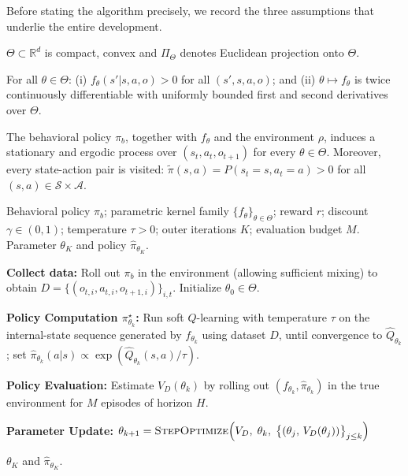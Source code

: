 \documentclass[12pt]{article}
\renewcommand{\[}{\left[}
\renewcommand{\]}{\right]}
\renewcommand{\(}{\left(}
\renewcommand{\)}{\right)}
\newcounter{l1}
\newcounter{l2}
\newcounter{l3}
\renewcommand{\tilde}{\widetilde}
\begin{document}
Before stating the algorithm precisely, we record the three assumptions that underlie
the entire development.

\begin{assumption}\label{ass:compact}
$\Theta \subset \mathbb{R}^d$ is compact, convex and $\Pi_\Theta$ denotes Euclidean projection
onto $\Theta$.
\end{assumption}

\begin{assumption}\label{ass:smooth_kernel}
For all $\theta \in \Theta$: (i) $f_\theta(s'|s,a,o) > 0$ for all $(s',s,a,o)$; and
(ii) $\theta \mapsto f_\theta$ is twice continuously differentiable with uniformly
bounded first and second derivatives over $\Theta$.
\end{assumption}

\begin{assumption}\label{ass:ergodic}
The behavioral policy $\pi_b$, together with $f_\theta$ and the environment $\rho$,
induces a stationary and ergodic process over $(s_t, a_t, o_{t+1})$ for every
$\theta \in \Theta$. Moreover, every state-action pair is visited:
$\tilde{\pi}(s,a) = P(s_t{=}s, a_t{=}a) > 0$ for all $(s,a) \in \mathcal{S}\times\mathcal{A}$.
\end{assumption}

\begin{algorithm}[t]
\caption{Iterative Agent Design}
\label{alg:main}
\begin{algorithmic}[1]
\Require Behavioral policy $\pi_b$; parametric kernel family $\{f_\theta\}_{\theta\in\Theta}$;
  reward $r$; discount $\gamma\!\in\!(0,1)$; temperature $\tau\!>\!0$;
  outer iterations $K$; evaluation budget $M$.
\Ensure Parameter $\theta_K$ and policy $\widehat\pi_{\theta_K}$.

\State \textbf{Collect data:} Roll out $\pi_b$ in the environment (allowing sufficient
  mixing) to obtain $D = \{(o_{t,i}, a_{t,i}, o_{t+1,i})\}_{i,t}$.
\State Initialize $\theta_0 \in \Theta$.

  \State \textbf{Policy Computation $\pi^\star_{\theta_k}$:}
    Run soft $Q$-learning with temperature $\tau$ on the internal-state sequence
    generated by $f_{\theta_k}$ using dataset $D$, until convergence to
    $\widehat{Q}_{\theta_k}$; set
    $\widehat\pi_{\theta_k}(a|s) \propto \exp(\widehat{Q}_{\theta_k}(s,a)/\tau)$.

  \State \textbf{Policy Evaluation:}
    Estimate $V_D(\theta_k)$ by rolling out $(f_{\theta_k}, \widehat\pi_{\theta_k})$
    in the true environment for $M$ episodes of horizon $H$.

  \State \textbf{Parameter Update:}
    $\displaystyle\theta_{k+1}
      = \textsc{StepOptimize}\!\left(
          V_D,\;\theta_k,\;
          \bigl\{(\theta_j,\, V_D(\theta_j))\bigr\}_{j \le k}
        \right)$
\EndFor

\State \Return $\theta_K$ and $\widehat\pi_{\theta_K}$.
\end{algorithmic}
\end{algorithm}
\end{document}
